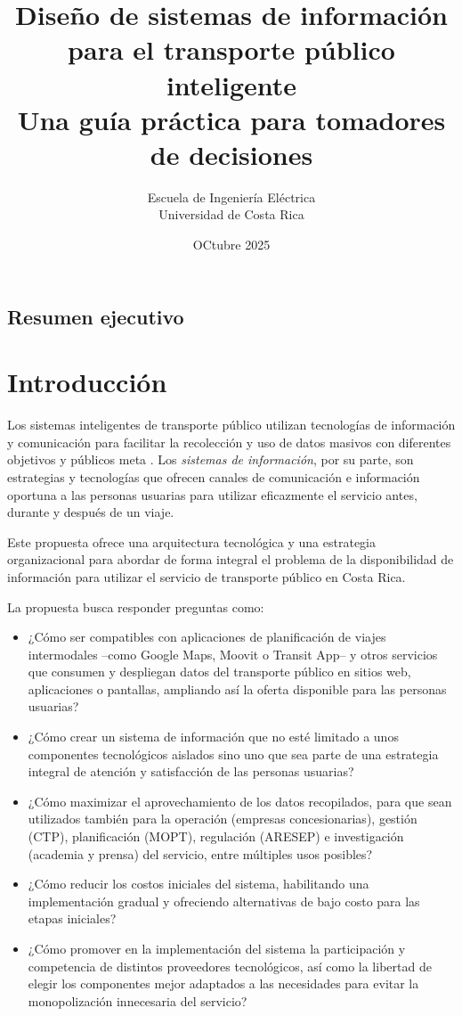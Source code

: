 \documentclass{report}
\title{Diseño de sistemas de información para el transporte público inteligente \\ \large{Una guía práctica para tomadores de decisiones}}
\author{Escuela de Ingeniería Eléctrica \\ Universidad de Costa Rica}
\date{OCtubre 2025}
\begin{document}

\maketitle

\section*{Resumen ejecutivo}

\tableofcontents

\chapter{Introducción}

Los sistemas inteligentes de transporte público utilizan tecnologías de información y comunicación para facilitar la recolección y uso de datos masivos con diferentes objetivos y públicos meta \cite{visan2022towards}. Los \textit{sistemas de información}, por su parte, son estrategias y tecnologías que ofrecen canales de comunicación e información oportuna a las personas usuarias para utilizar eficazmente el servicio \cite{barfield1998human} antes, durante y después de un viaje. 

Este propuesta ofrece una arquitectura tecnológica y una estrategia organizacional para abordar de forma integral el problema de la disponibilidad de información para utilizar el servicio de transporte público en Costa Rica.

La propuesta busca responder preguntas como:

\begin{itemize}
    \item ¿Cómo ser compatibles con aplicaciones de planificación de viajes intermodales --como Google Maps, Moovit o Transit App-- y otros servicios que consumen y despliegan datos del transporte público en sitios web, aplicaciones o pantallas, ampliando así la oferta disponible para las personas usuarias?
    \item ¿Cómo crear un sistema de información que no esté limitado a unos componentes tecnológicos aislados sino uno que sea parte de una estrategia integral de atención y satisfacción de las personas usuarias?
    \item ¿Cómo maximizar el aprovechamiento de los datos recopilados, para que sean utilizados también para la operación (empresas concesionarias), gestión (CTP), planificación (MOPT), regulación (ARESEP) e investigación (academia y prensa) del servicio, entre múltiples usos posibles?
    \item ¿Cómo reducir los costos iniciales del sistema, habilitando una implementación gradual y ofreciendo alternativas de bajo costo para las etapas iniciales?
    \item ¿Cómo promover en la implementación del sistema la participación y competencia de distintos proveedores tecnológicos, así como la libertad de elegir los componentes mejor adaptados a las necesidades para evitar la monopolización innecesaria del servicio?
\end{itemize}
\end{document}
